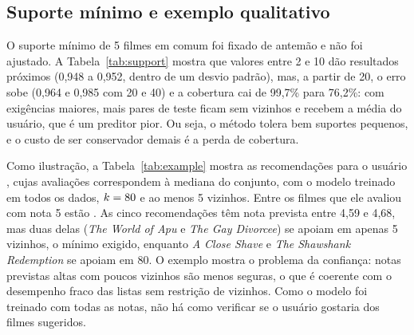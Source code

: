 \documentclass[conference]{IEEEtran}
\begin{document}
\subsection{Suporte m\'inimo e exemplo qualitativo}
O suporte m\'inimo de 5 filmes em comum foi fixado de antem\~ao e n\~ao foi ajustado. A Tabela~\ref{tab:support} mostra que valores entre 2 e 10 d\~ao resultados pr\'oximos (0,948 a 0,952, dentro de um desvio padr\~ao), mas, a partir de 20, o erro sobe (0,964 e 0,985 com 20 e 40) e a cobertura cai de 99,7\% para 76,2\%: com exig\^encias maiores, mais pares de teste ficam sem vizinhos e recebem a m\'edia do usu\'ario, que \'e um preditor pior. Ou seja, o m\'etodo tolera bem suportes pequenos, e o custo de ser conservador demais \'e a perda de cobertura.

\begin{table}[t]
\caption{Efeito do suporte m\'inimo de filmes em comum (Pearson centralizado, com o $k$ de cada parti\c{c}\~ao).}
\label{tab:support}
\centering
\small

\end{table}

Como ilustra\c{c}\~ao, a Tabela~\ref{tab:example} mostra as recomenda\c{c}\~oes para o usu\'ario \exUser{}, cujas \exN{} avalia\c{c}\~oes correspondem \`a mediana do conjunto, com o modelo treinado em todos os dados, $k=80$ e ao menos 5 vizinhos. Entre os filmes que ele avaliou com nota 5 est\~ao . As cinco recomenda\c{c}\~oes t\^em nota prevista entre 4,59 e 4,68, mas duas delas (\textit{The World of Apu} e \textit{The Gay Divorcee}) se apoiam em apenas 5 vizinhos, o m\'inimo exigido, enquanto \textit{A Close Shave} e \textit{The Shawshank Redemption} se apoiam em 80. O exemplo mostra o problema da confian\c{c}a: notas previstas altas com poucos vizinhos s\~ao menos seguras, o que \'e coerente com o desempenho fraco das listas sem restri\c{c}\~ao de vizinhos. Como o modelo foi treinado com todas as notas, n\~ao h\'a como verificar se o usu\'ario gostaria dos filmes sugeridos.

\begin{table}[t]
\caption{Recomenda\c{c}\~oes para o usu\'ario \exUser{} (KNN Pearson centralizado).}
\label{tab:example}
\centering
\footnotesize

\end{table}
\end{document}
